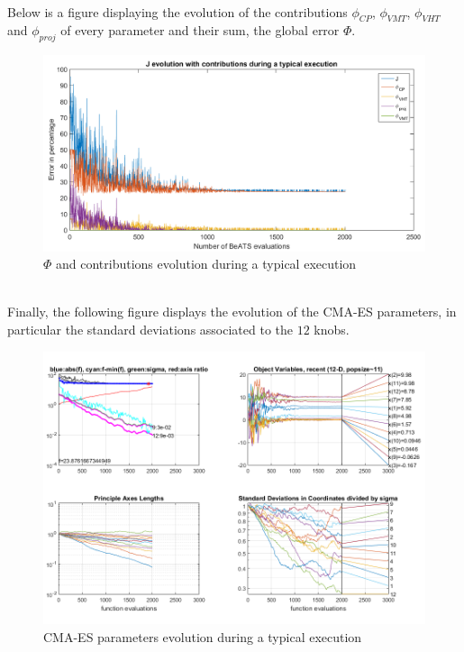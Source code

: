 \\
Below is a figure displaying the evolution of the contributions $\phi_{CP}$, $\phi_{VMT}$, $\phi_{VHT}$ and $\phi_{proj}$ of every parameter and their sum, the global error $\Phi$.\\
\begin{figure}[h]
	\label{fig:contributionsexample}
	\caption{$\Phi$ and contributions evolution during a typical execution}
	\includegraphics[width=7in]{figures/results_figures/contributionsexample.png}
\end{figure}	
\\
Finally, the following figure displays the evolution of the CMA-ES parameters, in particular the standard deviations associated to the $12$ knobs.\\
\begin{figure}[h]
	\label{fig:cmaesexample}
	\caption{CMA-ES parameters evolution during a typical execution}
	\includegraphics[width=7in]{figures/results_figures/cmaesexample.png}
\end{figure}	

